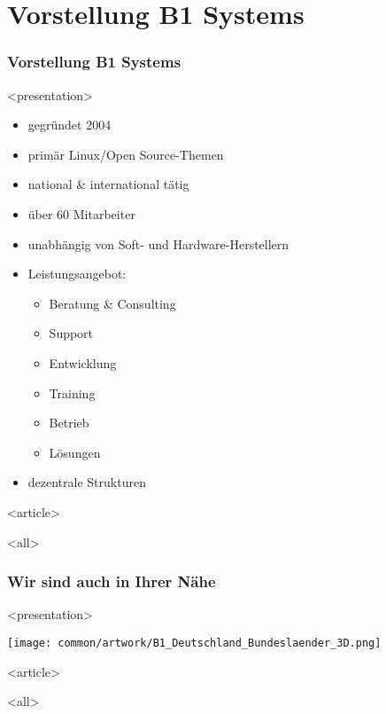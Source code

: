 
\section{Vorstellung B1 Systems}

\begin{frame}[fragile]
\frametitle<presentation>{Vorstellung B1 Systems}




\mode
<presentation>
\begin{itemize}
\item gegründet 2004
\item primär Linux/Open Source-Themen
\item national \& international tätig
\item über 60 Mitarbeiter
\item unabhängig von Soft- und Hardware-Herstellern
\item Leistungsangebot:
  \begin{itemize}
  \item Beratung \& Consulting
  \item Support
  \item Entwicklung
  \item Training
  \item Betrieb
  \item Lösungen
  \end{itemize}
\item dezentrale Strukturen
\end{itemize}

\mode
<article>

\mode
<all>

\end{frame}
\newpage

\begin{frame}[fragile]
\frametitle<presentation>{Wir sind auch in Ihrer Nähe}

 
\mode
<presentation>
\begin{center}
\texttt{[image: common/artwork/B1\_Deutschland\_Bundeslaender\_3D.png]}
\end{center}

\mode
<article>

\mode
<all>

\end{frame}
\newpage



